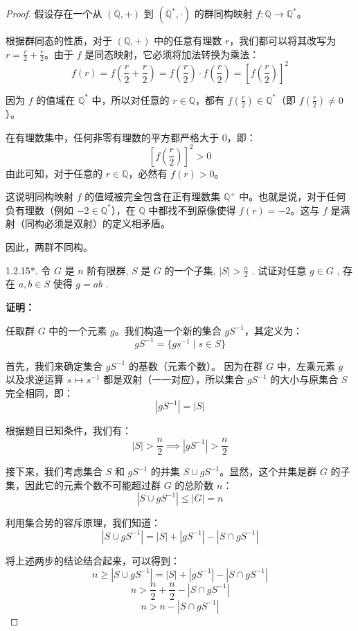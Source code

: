 \documentclass[]{article}
\begin{document}
\begin{proof}
	假设存在一个从 $(\mathbb{Q}, +)$ 到 $(\mathbb{Q}^*, \cdot)$ 的群同构映射 $f: \mathbb{Q} \to \mathbb{Q}^*$。
	
	根据群同态的性质，对于 $(\mathbb{Q}, +)$ 中的任意有理数 $r$，我们都可以将其改写为 $r = \frac{r}{2} + \frac{r}{2}$。由于 $f$ 是同态映射，它必须将加法转换为乘法：
	\[ f(r) = f\left(\frac{r}{2} + \frac{r}{2}\right) = f\left(\frac{r}{2}\right) \cdot f\left(\frac{r}{2}\right) = \left[f\left(\frac{r}{2}\right)\right]^2 \]
	
	因为 $f$ 的值域在 $\mathbb{Q}^*$ 中，所以对任意的 $r \in \mathbb{Q}$，都有 $f\left(\frac{r}{2}\right) \in \mathbb{Q}^*$（即 $f\left(\frac{r}{2}\right) \neq 0$）。
	
	在有理数集中，任何非零有理数的平方都严格大于 0，即：
	\[ \left[f\left(\frac{r}{2}\right)\right]^2 > 0 \]
	由此可知，对于任意的 $r \in \mathbb{Q}$，必然有 $f(r) > 0$。
	
	这说明同构映射 $f$ 的值域被完全包含在正有理数集 $\mathbb{Q}^+$ 中。也就是说，对于任何负有理数（例如 $-2 \in \mathbb{Q}^*$），在 $\mathbb{Q}$ 中都找不到原像使得 $f(r) = -2$。这与 $f$ 是满射（同构必须是双射）的定义相矛盾。
	
	因此，两群不同构。
	
	

1.2.15*. 令 $G$ 是 $n$ 阶有限群, $S$ 是 $G$ 的一个子集, $|S| > \frac{n}{2}$ . 试证对任意 $g \in G$ , 存在 $a, b \in S$ 使得 $g = ab$ . 

\bigskip
\noindent \textbf{证明：} 

任取群 $G$ 中的一个元素 $g$。我们构造一个新的集合 $gS^{-1}$，其定义为：
\[ gS^{-1} = \{ gs^{-1} \mid s \in S \} \]

首先，我们来确定集合 $gS^{-1}$ 的基数（元素个数）。
因为在群 $G$ 中，左乘元素 $g$ 以及求逆运算 $s \mapsto s^{-1}$ 都是双射（一一对应），所以集合 $gS^{-1}$ 的大小与原集合 $S$ 完全相同，即：
\[ |gS^{-1}| = |S| \]

根据题目已知条件，我们有：
\[ |S| > \frac{n}{2} \implies |gS^{-1}| > \frac{n}{2} \]

接下来，我们考虑集合 $S$ 和 $gS^{-1}$ 的并集 $S \cup gS^{-1}$。显然，这个并集是群 $G$ 的子集，因此它的元素个数不可能超过群 $G$ 的总阶数 $n$：
\[ |S \cup gS^{-1}| \le |G| = n \]

利用集合势的容斥原理，我们知道：
\[ |S \cup gS^{-1}| = |S| + |gS^{-1}| - |S \cap gS^{-1}| \]

将上述两步的结论结合起来，可以得到：
\[ n \ge |S \cup gS^{-1}| = |S| + |gS^{-1}| - |S \cap gS^{-1}| \]
\[ n > \frac{n}{2} + \frac{n}{2} - |S \cap gS^{-1}| \]
\[ n > n - |S \cap gS^{-1}| \]


\end{proof}
\end{document}
